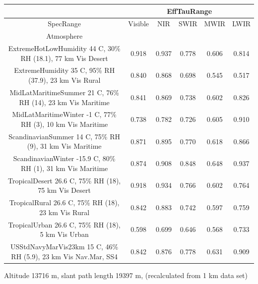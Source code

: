 \documentclass{workpackage}
\begin{document}
\begin{center}

\begin{footnotesize}

\begin{tabular}{|c|c|c|c|c|c|}
\hline
&\multicolumn{5}{|c|}{EffTauRange}\\\hline
SpecRange&Visible&NIR&SWIR&MWIR&LWIR\\\hline
Atmosphere&&&&&\\\hline
ExtremeHotLowHumidity 44 C, 30\% RH (18.1), 77 km Vis Desert&0.918&0.937&0.778&0.606&0.814\\\hline
ExtremeHumidity 35 C, 95\% RH (37.9), 23 km Vis Rural&0.840&0.868&0.698&0.545&0.517\\\hline
MidLatMaritimeSummer 21 C, 76\% RH (14), 23 km Vis Maritime&0.841&0.869&0.738&0.602&0.826\\\hline
MidLatMaritimeWinter -1 C, 77\% RH (3), 10 km Vis Maritime&0.738&0.782&0.726&0.605&0.910\\\hline
ScandinavianSummer 14 C, 75\% RH (9), 31 km Vis Maritime&0.871&0.895&0.770&0.618&0.866\\\hline
ScandinavianWinter -15.9 C, 80\% RH (1), 31 km Vis Maritime&0.874&0.908&0.848&0.648&0.937\\\hline
TropicalDesert 26.6 C, 75\% RH (18), 75 km Vis Desert&0.918&0.934&0.766&0.602&0.764\\\hline
TropicalRural 26.6 C, 75\% RH (18), 23 km Vis Rural&0.842&0.883&0.742&0.597&0.759\\\hline
TropicalUrban 26.6 C, 75\% RH (18), 5 km Vis Urban&0.598&0.699&0.646&0.568&0.733\\\hline
USStdNavyMarVis23km 15 C, 46\% RH (5.9), 23 km Vis Nav.Mar, SS4&0.842&0.876&0.778&0.631&0.909\\\hline

\end{tabular}
\end{footnotesize}
\end{center}


Altitude 13716 m, slant path length 19397 m, (recalculated from 1 km data set)
\end{document}
